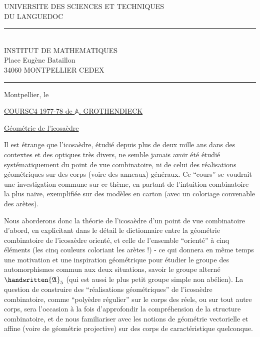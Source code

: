 \noindent\begin{minipage}[t]{0.57\linewidth}
\centering\rmfamily
UNIVERSITE DES SCIENCES ET TECHNIQUES\\
DU LANGUEDOC\\
\rule{0.55cm}{0.4pt}\\
{\sffamily INSTITUT DE MATHEMATIQUES\\
Place Eugène Bataillon\\
34060 MONTPELLIER CEDEX}\\
\rule{0.65cm}{0.4pt}
\end{minipage}\hfill
\begin{minipage}[t]{0.37\linewidth}
Montpellier, le
\end{minipage}

\begin{center}
\setlength{\ULdepth}{1.45\baselineskip}
\uline{COURS\quad C4 1977-78 de $\mathbb A$. GROTHENDIECK}\par\vspace{.6\baselineskip}
\end{center}

\uline{Géométrie de l'icosaèdre}

Il est étrange que l'icosaèdre, étudié depuis plus de deux mille ans dans des contextes et des optiques très divers, ne semble jamais avoir été étudié systématiquement du point de vue combinatoire, ni de celui des réalisations géométriques sur des corps (voire des anneaux) généraux. Ce ``cours'' se voudrait une investigation commune sur ce thème, en partant de l'intuition combinatoire la plus naïve, exemplifiée sur des modèles en carton (avec un coloriage convenable des arètes).

Nous aborderons donc la théorie de l'icosaèdre d'un point de vue combinatoire d'abord, en explicitant dans le détail le dictionnaire entre la géométrie combinatoire de l'icosaèdre orienté, et celle de l'ensemble ``orienté'' à cinq éléments (les cinq couleurs coloriant les arètes !) - ce qui donnera en même temps une motivation et une inspiration géométrique pour étudier le groupe des automorphismes commun aux deux situations, savoir le groupe alterné
$\handwritten{\mathfrak A}_5$ (qui est aussi le plus petit groupe simple non abélien). La question de construire des ``réalisations géométriques'' de l'icosaèdre combinatoire, comme ``polyèdre régulier'' sur le corps des réels, ou sur tout autre corps, sera l'occasion à la fois d'approfondir la compréhension de la structure combinatoire, et de nous familiariser avec les notions de géométrie vectorielle et affine (voire de géométrie projective) sur des corps de caractéristique quelconque.

